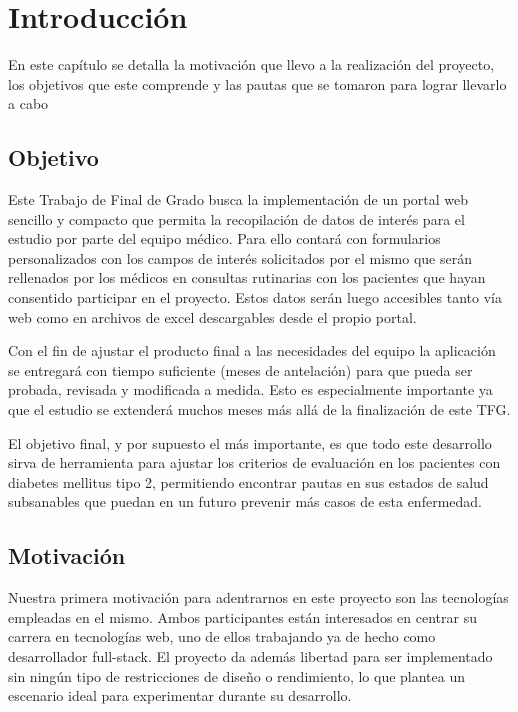 \chapter{Introducción}
 En este capítulo se detalla la motivación que llevo a la realización del proyecto, los objetivos que este comprende y las pautas que se tomaron para lograr llevarlo a cabo
    
    \section{Objetivo}
    
    Este Trabajo de Final de Grado busca la implementación de un portal web sencillo y compacto que permita la recopilación de datos de interés para el estudio por parte del equipo médico. Para ello contará con formularios personalizados con los campos de interés  solicitados por el mismo que serán rellenados por los médicos en consultas rutinarias con los pacientes que hayan consentido participar en el proyecto. Estos datos serán luego accesibles tanto vía web como en archivos de excel descargables desde el propio portal.\newline

	Con el fin de ajustar el producto final a las necesidades del equipo la aplicación se entregará con tiempo suficiente (meses de antelación) para que pueda ser probada, revisada y modificada a medida. Esto es especialmente importante ya que el estudio se extenderá muchos meses más allá de la finalización de este TFG.\newline

	El objetivo final, y por supuesto el más importante, es que todo este desarrollo sirva de herramienta para ajustar los criterios de evaluación en los pacientes con diabetes mellitus tipo 2, permitiendo encontrar pautas en sus estados de salud subsanables que puedan en un futuro prevenir más casos de esta enfermedad.\newpage
	
	\section{Motivación}
    
    Nuestra primera motivación para adentrarnos en este proyecto son las tecnologías empleadas en el mismo. Ambos participantes están interesados en centrar su carrera en tecnologías web, uno de ellos trabajando ya de hecho como desarrollador full-stack. El proyecto da además libertad para ser implementado sin ningún tipo de restricciones de diseño o rendimiento, lo que plantea un escenario ideal para experimentar durante su desarrollo.\newline


